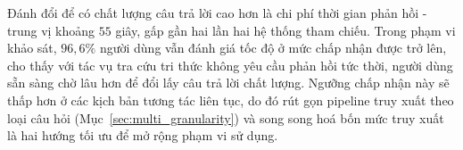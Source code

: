 Đánh đổi để có chất lượng câu trả lời cao hơn là chi phí thời gian phản hồi - trung vị khoảng $55$ giây, gấp gần hai lần hai hệ thống tham chiếu. Trong phạm vi khảo sát, $96,6\%$ người dùng vẫn đánh giá tốc độ ở mức chấp nhận được trở lên, cho thấy với tác vụ tra cứu tri thức không yêu cầu phản hồi tức thời, người dùng sẵn sàng chờ lâu hơn để đổi lấy câu trả lời chất lượng. Ngưỡng chấp nhận này sẽ thấp hơn ở các kịch bản tương tác liên tục, do đó rút gọn pipeline truy xuất theo loại câu hỏi (Mục~\ref{sec:multi_granularity}) và song song hoá bốn mức truy xuất là hai hướng tối ưu để mở rộng phạm vi sử dụng.